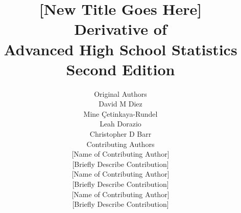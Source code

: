 

\title{\huge [New Title Goes Here] \\[2mm]
\large Derivative of \\
Advanced High School Statistics \\
Second Edition}
\author{\Large Original Authors \\[1.5mm]
\normalsize David M Diez \\
\normalsize Mine \c{C}etinkaya-Rundel \\
\normalsize Leah Dorazio\\
\normalsize Christopher D Barr \\[8mm]
\Large Contributing Authors \\[1.5mm]
\normalsize [Name of Contributing Author] \\
\small [Briefly Describe Contribution] \\[2mm]
\normalsize [Name of Contributing Author] \\
\small [Briefly Describe Contribution] \\[2mm]
\normalsize [Name of Contributing Author] \\
\small [Briefly Describe Contribution] \\[2mm]
}

